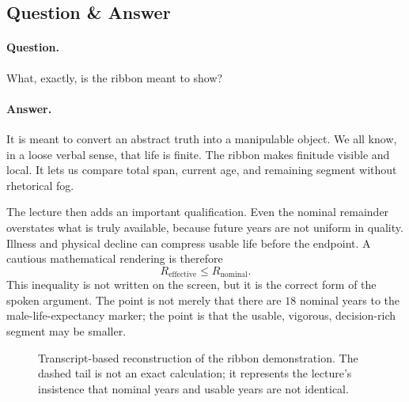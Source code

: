\subsection{Question \& Answer}

\paragraph{Question.} What, exactly, is the ribbon meant to show?

\paragraph{Answer.} It is meant to convert an abstract truth into a manipulable object. We all know, in a loose verbal sense, that life is finite. The ribbon makes finitude visible and local. It lets us compare total span, current age, and remaining segment without rhetorical fog.

The lecture then adds an important qualification. Even the nominal remainder overstates what is truly available, because future years are not uniform in quality. Illness and physical decline can compress usable life before the endpoint. A cautious mathematical rendering is therefore
\begin{equation}
R_{\text{effective}} \le R_{\text{nominal}}.
\end{equation}
This inequality is not written on the screen, but it is the correct form of the spoken argument. The point is not merely that there are \(18\) nominal years to the male-life-expectancy marker; the point is that the usable, vigorous, decision-rich segment may be smaller.

\begin{figure}[h]
\centering
{}
\caption{Transcript-based reconstruction of the ribbon demonstration. The dashed tail is not an exact calculation; it represents the lecture's insistence that nominal years and usable years are not identical.}
\end{figure}

